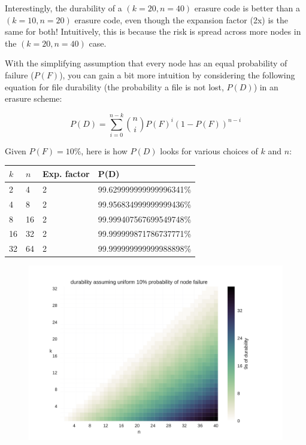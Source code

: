 \documentclass[a4paper,10pt]{article}
\begin{document}
Interestingly, the durability of a $(k=20,n=40)$ erasure code is better than
a $(k=10,n=20)$ erasure code, even though the expansion factor (2x) is the same
for both! Intuitively, this is because the risk is spread across more nodes in
the $(k=20,n=40)$ case.

With the simplifying assumption that every node has an equal probability of
failure ($P(F)$), you can gain a bit more intuition by considering the following
equation for file durability (the probability a file is not lost, $P(D)$) in an
erasure scheme:

$$
P(D) = \sum_{i=0}^{n-k} \binom{n}{i} P(F)^i (1-P(F))^{n-i}
$$

Given $P(F)=10\%$, here is how $P(D)$ looks for various choices of $k$ and $n$:

\begin{center}
\begin{tabular}{l l l l}
$k$ & $n$ & Exp. factor & P(D) \\
\hline
2 & 4 & 2 & 99.629999999999996341\%\\
4 & 8 & 2 & 99.956834999999999436\%\\
8 & 16 & 2 & 99.999407567699549748\%\\
16 & 32 & 2 & 99.999999871786737771\%\\
32 & 64 & 2 & 99.999999999999988898\%\\
\end{tabular}

\begin{figure}[hbt]
\includegraphics[width=\linewidth]{durability/durability}
\end{figure}
\end{center}
\end{document}
